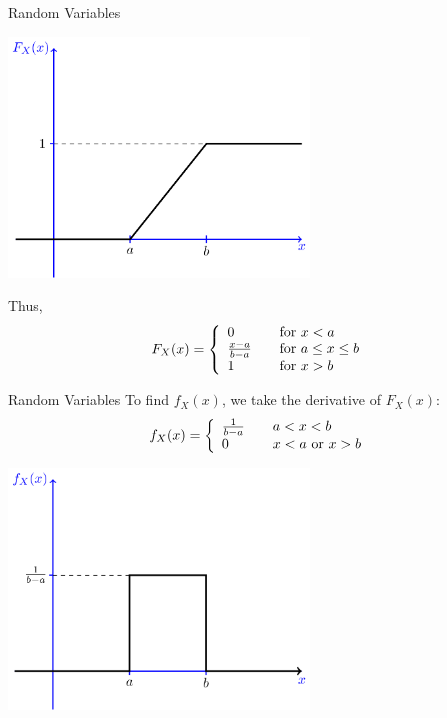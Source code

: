 \documentclass{beamer}
\begin{document}
\begin{frame}{Random Variables}
      \begin{center}

    \includegraphics[width=0.6\textwidth, height=\textheight, keepaspectratio]{ex_cdf.png}
  \end{center}
\pause
Thus, 
\begin{equation*}
F_X(x) = \left\{
\begin{array}{l l}
0 & \quad \text{for } x < a \\
\frac{x-a}{b-a} & \quad \text{for }a \leq x \leq b\\
1 & \quad \text{for } x > b
\end{array} \right.
\end{equation*}

\end{frame}



\begin{frame}{Random Variables}
To find $f_X(x)$, we take the derivative of $F_X(x)$:
\begin{equation*}
f_X(x) = \left\{
\begin{array}{l l}
\frac{1}{b-a} & \quad a < x < b\\
0 & \quad x < a \text{ or } x > b
\end{array} \right.
\end{equation*}\pause
      \begin{center}

    \includegraphics[width=0.6\textwidth, height=\textheight, keepaspectratio]{ex_pdf.png}
  \end{center}

\end{frame}
\end{document}
